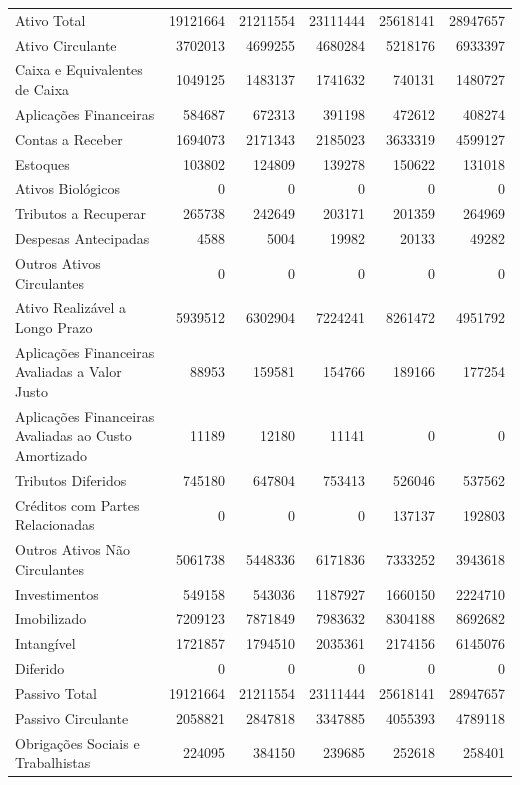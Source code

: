 \documentclass[grad,numbers]{coppe}
\begin{document}
\begin{longtable}[t]{lrrrrr}
  \endfoot
  \bottomrule
  \endlastfoot
  Ativo Total & 19121664 & 21211554 & 23111444 & 25618141 & 28947657\\
  Ativo Circulante & 3702013 & 4699255 & 4680284 & 5218176 & 6933397\\
  Caixa e Equivalentes de Caixa & 1049125 & 1483137 & 1741632 & 740131 & 1480727\\
  Aplicações Financeiras & 584687 & 672313 & 391198 & 472612 & 408274\\
  Contas a Receber & 1694073 & 2171343 & 2185023 & 3633319 & 4599127\\
  \addlinespace
  Estoques & 103802 & 124809 & 139278 & 150622 & 131018\\
  Ativos Biológicos & 0 & 0 & 0 & 0 & 0\\
  Tributos a Recuperar & 265738 & 242649 & 203171 & 201359 & 264969\\
  Despesas Antecipadas & 4588 & 5004 & 19982 & 20133 & 49282\\
  Outros Ativos Circulantes & 0 & 0 & 0 & 0 & 0\\
  \addlinespace
  Ativo Realizável a Longo Prazo & 5939512 & 6302904 & 7224241 & 8261472 & 4951792\\
  Aplicações Financeiras Avaliadas a Valor Justo & 88953 & 159581 & 154766 & 189166 & 177254\\
  Aplicações Financeiras Avaliadas ao Custo Amortizado & 11189 & 12180 & 11141 & 0 & 0\\
  Tributos Diferidos & 745180 & 647804 & 753413 & 526046 & 537562\\
  Créditos com Partes Relacionadas & 0 & 0 & 0 & 137137 & 192803\\
  \addlinespace
  Outros Ativos Não Circulantes & 5061738 & 5448336 & 6171836 & 7333252 & 3943618\\
  Investimentos & 549158 & 543036 & 1187927 & 1660150 & 2224710\\
  Imobilizado & 7209123 & 7871849 & 7983632 & 8304188 & 8692682\\
  Intangível & 1721857 & 1794510 & 2035361 & 2174156 & 6145076\\
  Diferido & 0 & 0 & 0 & 0 & 0\\
  \addlinespace
  Passivo Total & 19121664 & 21211554 & 23111444 & 25618141 & 28947657\\
  Passivo Circulante & 2058821 & 2847818 & 3347885 & 4055393 & 4789118\\
  Obrigações Sociais e Trabalhistas & 224095 & 384150 & 239685 & 252618 & 258401\\

\end{longtable}
\end{document}
